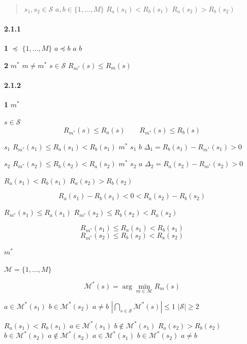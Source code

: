 \documentclass[
  12pt,
]{article}
\begin{document}
\begin{quote}
\textbf{} \(s_1, s_2 \in \mathcal{S}\) 
\(a, b \in \{1,\ldots,M\}\) \(R_a(s_1) < R_b(s_1)\) 
\(R_a(s_2) > R_b(s_2)\)
\end{quote}

\paragraph{2.1.1 }\label{ux5f62ux5f0fux5316ux5b9aux4e49}

\textbf{ 1} \(\preceq\)
 \(\{1,\ldots,M\}\)  \(a \preceq b\)
\(a\)  \(b\)

\textbf{ 2} \(m^*\)
 \(m \neq m^*\) 
\(s \in \mathcal{S}\) \(R_{m^*}(s) \leq R_m(s)\)

\paragraph{2.1.2 }\label{ux8bc1ux660e}

\textbf{ 1}  \(m^*\)

 \(s \in \mathcal{S}\)
\[R_{m^*}(s) \leq R_a(s) \quad \text{} \quad R_{m^*}(s) \leq R_b(s)\]

 \(s_1\) \(R_{m^*}(s_1) \leq R_a(s_1) < R_b(s_1)\)
\(m^*\)  \(s_1\)  \(b\)
\(\Delta_1 = R_b(s_1) - R_{m^*}(s_1) > 0\)

 \(s_2\) \(R_{m^*}(s_2) \leq R_b(s_2) < R_a(s_2)\) \(m^*\)
 \(s_2\)  \(a\)
\(\Delta_2 = R_a(s_2) - R_{m^*}(s_2) > 0\)

 \(R_a(s_1) < R_b(s_1)\)  \(R_a(s_2) > R_b(s_2)\) 

\[R_a(s_1) - R_b(s_1) < 0 < R_a(s_2) - R_b(s_2)\]

 \(R_{m^*}(s_1) \leq R_a(s_1)\) 
\(R_{m^*}(s_2) \leq R_b(s_2) < R_a(s_2)\)

\[R_{m^*}(s_1) \leq R_a(s_1) < R_b(s_1)\]
\[R_{m^*}(s_2) \leq R_b(s_2) < R_a(s_2)\]



\textbf{} \(m^*\)
\textbf{}

 \(\mathcal{M} = \{1,\ldots,M\}\)

\[\mathcal{M}^*(s) = \arg\min_{m \in \mathcal{M}} R_m(s)\]

 \(a \in \mathcal{M}^*(s_1)\)  \(b \in \mathcal{M}^*(s_2)\)
\(a \neq b\)
\(|\bigcap_{s \in \mathcal{S}} \mathcal{M}^*(s)| \leq 1\)
\(|\mathcal{S}| \geq 2\)


 \(R_a(s_1) < R_b(s_1)\)  \(a \in \mathcal{M}^*(s_1)\) 
\(b \notin \mathcal{M}^*(s_1)\) \(R_a(s_2) > R_b(s_2)\) 
\(b \in \mathcal{M}^*(s_2)\) 
\(a \notin \mathcal{M}^*(s_2)\) \(a \in \mathcal{M}^*(s_1)\)
 \(b \in \mathcal{M}^*(s_2)\) \(a \neq b\) 
\end{document}
